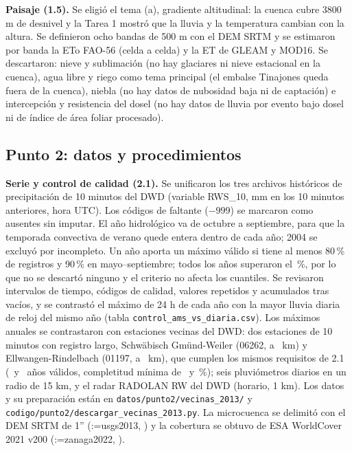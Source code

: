 \documentclass[12pt,a4paper]{article}
\makeatletter
\newcommand{\parencite}[2][]{(\@tempswafalse\@for\rk:=#2\do{\if@tempswa; \fi\@tempswatrue\csname rA@\rk\endcsname, \csname rY@\rk\endcsname}\ifx\relax#1\relax\else, #1\fi)}
\makeatother
\begin{document}
\textbf{Paisaje (1.5).} Se eligió el tema (a), gradiente altitudinal: la cuenca cubre 3800 m de desnivel y la Tarea 1 mostró que la lluvia y la temperatura cambian con la altura. Se definieron ocho bandas de 500 m con el DEM SRTM y se estimaron por banda la ETo FAO-56 (celda a celda) y la ET de GLEAM y MOD16. Se descartaron: nieve y sublimación (no hay glaciares ni nieve estacional en la cuenca), agua libre y riego como tema principal (el embalse Tinajones queda fuera de la cuenca), niebla (no hay datos de nubosidad baja ni de captación) e intercepción y resistencia del dosel (no hay datos de lluvia por evento bajo dosel ni de índice de área foliar procesado).

\subsection{Punto 2: datos y procedimientos}

\textbf{Serie y control de calidad (2.1).} Se unificaron los tres archivos históricos de precipitación de 10 minutos del DWD (variable RWS\_10, mm en los 10 minutos anteriores, hora UTC). Los códigos de faltante ($-999$) se marcaron como ausentes sin imputar. El año hidrológico va de octubre a septiembre, para que la temporada convectiva de verano quede entera dentro de cada año; 2004 se excluyó por incompleto. Un año aporta un máximo válido si tiene al menos 80\,\% de registros y 90\,\% en mayo--septiembre; todos los años superaron el \CompletMin\,\%, por lo que no se descartó ninguno y el criterio no afecta los cuantiles. Se revisaron intervalos de tiempo, códigos de calidad, valores repetidos y acumulados tras vacíos, y se contrastó el máximo de 24 h de cada año con la mayor lluvia diaria de reloj del mismo año (tabla \texttt{control\_ams\_vs\_diaria.csv}). Los máximos anuales se contrastaron con estaciones vecinas del DWD: dos estaciones de 10 minutos con registro largo, Schwäbisch Gmünd-Weiler (06262, a \EvGmundKm\ km) y Ellwangen-Rindelbach (01197, a \EvEllwKm\ km), que cumplen los mismos requisitos de 2.1 (\VecGmundAnios\ y \VecEllwAnios\ años válidos, completitud mínima de \VecGmundComp\ y \VecEllwComp\,\%); seis pluviómetros diarios en un radio de 15 km, y el radar RADOLAN RW del DWD (horario, 1 km). Los datos y su preparación están en \texttt{datos/punto2/vecinas\_2013/} y \texttt{codigo/punto2/descargar\_vecinas\_2013.py}. La microcuenca se delimitó con el DEM SRTM de 1'' \parencite{usgs2013} y la cobertura se obtuvo de ESA WorldCover 2021 v200 \parencite{zanaga2022}.
\end{document}
